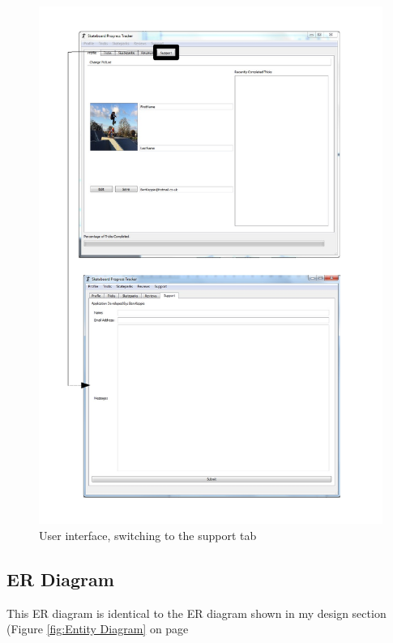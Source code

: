 \begin{figure}[H]
    \includegraphics[width=\textwidth]{./Maintenance/Figures/SupportTab.pdf}
    \caption{User interface, switching to the support tab} \label{fig:Support Tab UI}
\end{figure}











\subsection{ER Diagram}

This ER diagram is identical to the ER diagram shown in my design section (Figure \ref{fig:Entity Diagram} on page \pageref{fig:Entity Diagram}

